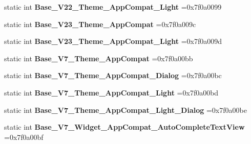 \begin{DoxyCompactItemize}
static int {\bfseries Base\+\_\+\+V22\+\_\+\+Theme\+\_\+\+App\+Compat\+\_\+\+Light} =0x7f0a0099
\item 
\mbox{\label{classandroid_1_1support_1_1graphics_1_1drawable_1_1R_1_1style_a9e1b19b4f68589cbc21b0a66d0461dae}} 
static int {\bfseries Base\+\_\+\+V23\+\_\+\+Theme\+\_\+\+App\+Compat} =0x7f0a009c
\item 
\mbox{\label{classandroid_1_1support_1_1graphics_1_1drawable_1_1R_1_1style_af57804dcdcb8f7bcee34cdf635127f5d}} 
static int {\bfseries Base\+\_\+\+V23\+\_\+\+Theme\+\_\+\+App\+Compat\+\_\+\+Light} =0x7f0a009d
\item 
\mbox{\label{classandroid_1_1support_1_1graphics_1_1drawable_1_1R_1_1style_a09b63777f01757788392a220621f3bac}} 
static int {\bfseries Base\+\_\+\+V7\+\_\+\+Theme\+\_\+\+App\+Compat} =0x7f0a00bb
\item 
\mbox{\label{classandroid_1_1support_1_1graphics_1_1drawable_1_1R_1_1style_accd6006a6ec87fbbc05800720fc4a611}} 
static int {\bfseries Base\+\_\+\+V7\+\_\+\+Theme\+\_\+\+App\+Compat\+\_\+\+Dialog} =0x7f0a00bc
\item 
\mbox{\label{classandroid_1_1support_1_1graphics_1_1drawable_1_1R_1_1style_a62068f6cb9db04d339ed0327ecfc36c8}} 
static int {\bfseries Base\+\_\+\+V7\+\_\+\+Theme\+\_\+\+App\+Compat\+\_\+\+Light} =0x7f0a00bd
\item 
\mbox{\label{classandroid_1_1support_1_1graphics_1_1drawable_1_1R_1_1style_a79d37fa134806007923aabb2a3c18312}} 
static int {\bfseries Base\+\_\+\+V7\+\_\+\+Theme\+\_\+\+App\+Compat\+\_\+\+Light\+\_\+\+Dialog} =0x7f0a00be
\item 
\mbox{\label{classandroid_1_1support_1_1graphics_1_1drawable_1_1R_1_1style_af3911cd1af2e66b3505f9b26c495c36c}} 
static int {\bfseries Base\+\_\+\+V7\+\_\+\+Widget\+\_\+\+App\+Compat\+\_\+\+Auto\+Complete\+Text\+View} =0x7f0a00bf

\end{DoxyCompactItemize}
